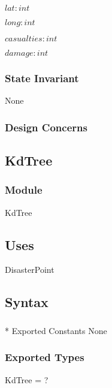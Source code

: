 \documentclass[12pt]{article}
\begin{document}
                $lat: int$
                
                $long: int$
                
                $casualties: int$
                
                $damage: int$
                
                \subsubsection* {State Invariant}
                None
                \subsubsection* {Design Concerns}
                
                \newpage
                \subsection* {KdTree}
                
                \subsubsection*{Module}
                KdTree
                
                \subsection* {Uses}
                DisasterPoint
                
                \subsection* {Syntax}
                
                \subsubsection{}* {Exported Constants}
                None
                \subsubsection* {Exported Types}
                KdTree = ?
\end{document}
